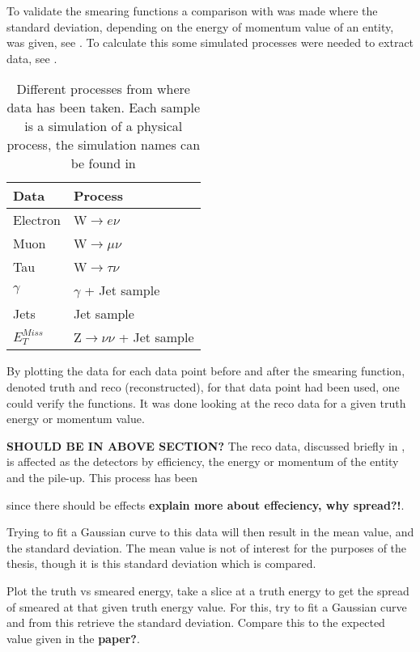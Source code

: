To validate the smearing functions a comparison with \citep{ATL-PHYS-PUB-2013-004} was made where the standard deviation, depending on the energy of momentum value of an entity, was given, see . To calculate this some simulated processes were needed to extract data, see . 
\begin{SCtable}[][ht]
\begin{tabular}{|l|l|}
\hline
Data & Process \\ \hline
Electron & W$\rightarrow e\nu$ \\
Muon & W$\rightarrow \mu \nu$ \\
Tau & W$\rightarrow \tau \nu$ \\
$\gamma$ & $\gamma$ + Jet sample \\
Jets & Jet sample \\
$E_T^{Miss}$ & Z$\rightarrow \nu \nu$ + Jet sample \\ \hline
\end{tabular}
\caption{Different processes from where data has been taken. Each sample is a simulation of a physical process, the simulation names can be found in }
\label{tab:backproc}
\end{SCtable}


By plotting the data for each data point before and after the smearing function, denoted truth and reco (reconstructed), for that data point had been used, one could verify the functions. It was done looking at the reco data for a given truth energy or momentum value. 

\textbf{SHOULD BE IN ABOVE SECTION?}
The reco data, discussed briefly in , is affected as the detectors by efficiency, the energy or momentum of the entity and the pile-up. This process has been 

 since there should be effects \textbf{explain more about effeciency, why spread?!}. 

Trying to fit a Gaussian curve to this data will then result in the mean value, and the standard deviation. The mean value is not of interest for the purposes of the thesis, though it is this standard deviation which is compared. 

Plot the truth vs smeared energy, take a slice at a truth energy to get the spread of smeared at that given truth energy value. For this, try to fit a Gaussian curve and from this retrieve the standard deviation. Compare this to the expected value given in the \textbf{paper?}.


